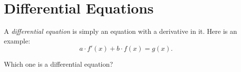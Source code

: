 \documentclass{ximera}
\begin{document}

\section{Differential Equations}

A \textit{differential equation} is
simply an equation with a derivative in it. Here is an example:
\[
a\cdot f'(x)+ b\cdot f(x) = g(x). 
\]
\begin{question}
	Which one is a differential equation?
	\begin{multipleChoice}
	\end{multipleChoice}
\end{question}
\end{document}
